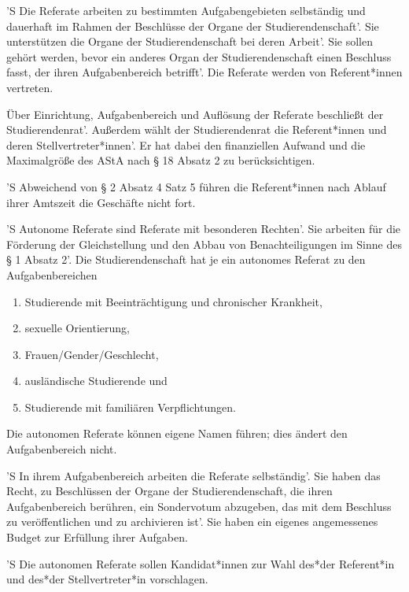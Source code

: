 \documentclass[fontsize=12pt,parskip=half]{scrartcl}
\begin{document}
\begin{contract}
  'S Die Referate arbeiten zu bestimmten Aufgabengebieten selbständig und dauerhaft
  im Rahmen der Beschlüsse der Organe der Studierendenschaft'. Sie unterstützen
  die Organe der Studierendenschaft bei deren Arbeit'. Sie sollen gehört werden,
  bevor ein anderes Organ der Studierendenschaft einen Beschluss fasst, der
  ihren Aufgabenbereich betrifft'. Die Referate werden von Referent*innen
  vertreten.

  Über Einrichtung, Aufgabenbereich und Auflösung der Referate beschließt der
  Studierendenrat'. Außerdem wählt der Studierendenrat die Referent*innen und
  deren Stellvertreter*innen'. Er hat dabei den finanziellen Aufwand und die
  Maximalgröße des AStA nach § 18 Absatz 2 zu berücksichtigen.

  'S Abweichend von § 2 Absatz 4 Satz 5 führen die Referent*innen nach Ablauf ihrer
  Amtszeit die Geschäfte nicht fort.



  'S Autonome Referate sind Referate mit besonderen Rechten'. Sie arbeiten für die
  Förderung der Gleichstellung und den Abbau von Benachteiligungen im Sinne des
  § 1 Absatz 2'. Die Studierendenschaft hat je ein autonomes Referat zu den
  Aufgabenbereichen
  \begin{enumerate}[\qquad 1.]
  \item Studierende mit Beeinträchtigung und chronischer Krankheit,
  \item sexuelle Orientierung,
  \item Frauen/Gender/Geschlecht,
  \item ausländische Studierende und
  \item Studierende mit familiären Verpflichtungen.
  \end{enumerate}
  Die autonomen Referate können eigene Namen führen; dies ändert den
  Aufgabenbereich nicht.

  'S In ihrem Aufgabenbereich arbeiten die Referate selbständig'. Sie haben das
  Recht, zu Beschlüssen der Organe der Studierendenschaft, die ihren
  Aufgabenbereich berühren, ein Sondervotum abzugeben, das mit dem Beschluss zu
  veröffentlichen und zu archivieren ist'. Sie haben ein eigenes angemessenes
  Budget zur Erfüllung ihrer Aufgaben.

  'S Die autonomen Referate sollen Kandidat*innen zur Wahl des*der Referent*in und
  des*der Stellvertreter*in vorschlagen.


\end{contract}
\end{document}
